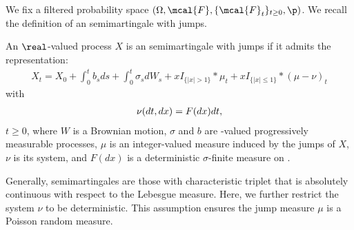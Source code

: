 We fix a filtered probability space $(\Omega, \mcal{F}, \{\mcal{F}_t\}_{t \ge 0}, \p)$. We recall the definition of an \ito semimartingale with \levy jumps.  
\begin{defn}
  An $\real$-valued process $X$ is an \ito semimartingale with \levy jumps if it admits the representation:
  \begin{align}
    X_t = X_0 + \int^t_0 b_s ds + \int^t_0 \sigma_s d W_s  + x  I_{\{\vert x \vert > 1\}} \ast \mu_t  + x  I_{\{\vert x \vert \le  1\}} \ast (\mu - \nu)_t 
    \label{eq:semimartingale}
  \end{align}
  with 
  \begin{align}
    \nu(dt, dx) = F(dx) dt, \notag
    \label{}
  \end{align}
  $t \ge 0$, where $W$ is a Brownian motion, $\sigma$ and $b$ are \real-valued progressively measurable processes, $\mu$ is an integer-valued measure induced by the jumps  of $X$, $\nu$ is its \levy system, and $F(dx)$ is a  deterministic $\sigma$-finite measure on \real. 
\end{defn}
\begin{remark}
  Generally, \ito semimartingales are those with characteristic triplet  that is absolutely continuous with respect to the Lebesgue measure. Here, we further restrict the \levy system $\nu$ to be deterministic. This assumption ensures the jump measure $\mu$ is a Poisson random measure. 
\end{remark}

